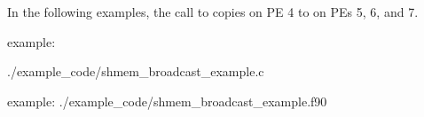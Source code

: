 \begin{apidefinition}
\begin{apiexamples}

\apicexample
    {In the following examples, the call to  copies \source{}
    on \ac{PE} 4 to \dest{} on \acp{PE} 5, 6, and 7. 
    
    \CorCpp{} example:}
    {./example_code/shmem_broadcast_example.c}
    {}

\apifexample
    {\Fortran example:}
    {./example_code/shmem_broadcast_example.f90}
    {}

\end{apiexamples}

\end{apidefinition}
